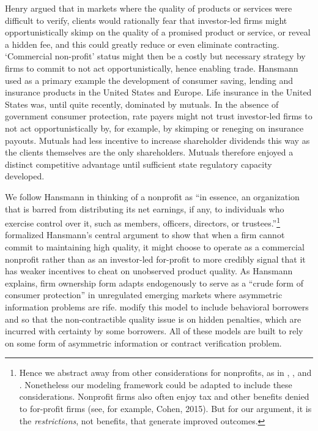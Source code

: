 \documentclass[11pt,english]{article}
\theoremstyle{plain}
\theoremstyle{definition}
\begin{document}
 Henry
\citet{hansmann1996a} argued that in markets where the
quality of products or services were difficult to verify, clients
would rationally fear that investor-led firms might opportunistically
skimp on the quality of a promised product or service, or reveal a
hidden fee, and this could greatly reduce or even eliminate contracting.
 `Commercial non-profit' status might then be a
costly but necessary strategy by firms to commit to not act opportunistically,
hence enabling trade.
Hansmann used as a primary example the development of
consumer saving, lending and insurance products in the United States
and Europe. Life insurance in the United States was, until
quite recently, dominated by mutuals. In the absence of government consumer protection, rate payers might
not trust investor-led firms to not act  opportunistically by, for
example, by skimping or reneging on insurance
payouts. Mutuals  had less incentive to  increase shareholder dividends this way as the clients themselves are the
only shareholders. Mutuals therefore enjoyed a distinct competitive
advantage until sufficient state regulatory capacity developed.

We follow Hansmann in thinking of a nonprofit as ``in
essence, an organization that is barred from distributing its net
earnings, if any, to individuals who exercise control over it, such
as members, officers, directors, or trustees.''\footnote{Hence we abstract away from other considerations for nonprofits, as
in \citet{besley2005}, \citet{mcintosh2005}, and \citet{guha2013}.
Nonetheless our modeling framework could be adapted to include these
considerations. Nonprofit firms also often enjoy tax and other benefits denied to for-profit firms (see, for example, Cohen, 2015). But for
our argument, it is the \textit{restrictions},
not benefits, that generate improved outcomes.} \citet{glaeser2001} formalized Hansmann's central argument
to show that when a firm cannot commit to maintaining high quality,
it might choose to operate as a commercial nonprofit rather than as
an investor-led for-profit to more credibly signal that it has
weaker incentives to cheat on unobserved product
quality. As Hansmann explains, firm ownership form adapts endogenously
to serve as a ``crude form of consumer protection'' in unregulated emerging
markets where asymmetric information problems are rife. \citet{bubb2013}
modify this model to include behavioral borrowers and so that the non-contractible quality issue is on
hidden penalties, which are incurred with certainty by some borrowers.
All of these models are built to rely on some form of asymmetric information
or contract verification problem.
\end{document}
